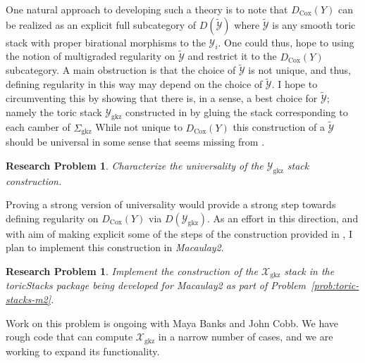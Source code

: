 \documentclass[11pt,reqno]{amsart}
\newtheorem{problem}[lemma]{Research Problem}
\theoremstyle{remark}
\newtheorem{example}[lemma]{Example}
\newcommand{\Cox}{\operatorname{Cox}}
\newcommand{\GKZ}{\operatorname{gkz}}
\newcommand{\PP}{\mathbb{P}}
\newcommand{\cH}{\mathcal{H}}
\newcommand{\cP}{\mathcal{P}}
\newcommand{\cX}{\mathcal{X}}
\newcommand{\cY}{\mathcal{Y}}
\begin{document}
 One natural approach to developing such a theory is to note that $D_{\Cox}(Y)$ can be realized as an explicit full subcategory of $D(\tilde{\cY})$ where $\tilde{\cY}$ is any smooth toric stack with proper birational morphisms to the $\cY_i$. One could thus, hope to using the notion of multigraded regularity on $\tilde{\cY}$ and restrict it to the $D_{\Cox}(Y)$ subcategory. A main obstruction is that the choice of $\tilde{\cY}$ is not unique, and thus, defining regularity in this way may depend on the choice of $\tilde{\cY}$. I hope to circumventing this by showing that there is, in a sense, a best choice for $\tilde{\cY}$; namely the toric stack $\cY_{\GKZ}$ constructed in \cite[Section 3]{longLiveKing} by gluing the stack corresponding to each camber of $\Sigma_{\GKZ}$ While not unique to $D_{\Cox}(Y)$ this construction of a $\tilde{\cY}$ should be universal in some sense that seems missing from \cite[Section 3]{longLiveKing}.
 \begin{problem}
 	Characterize the universality of the $\cY_{\GKZ}$ stack construction.
 \end{problem}
 
 Proving a strong version of universality would provide a strong step towards defining regularity on $D_{\Cox}(Y)$ via $D(\cY_{\GKZ})$.  As an effort in this direction, and with aim of making explicit some of the steps of the construction provided in \cite{longLiveKing}, I plan to implement this construction in \textit{Macaulay2}. 
 
\begin{problem}
	Implement the construction of the $\cX_{\GKZ}$ stack in the \textit{toricStacks} package being developed for \textit{Macaulay2} as part of Problem~\ref{prob:toric-stacks-m2}.
\end{problem}
 
 Work on this problem is  ongoing with Maya Banks and John Cobb. We have rough code that can compute $\cX_{\GKZ}$ in a narrow number of cases, and we  are working to expand its functionality. 
 
\end{document}
